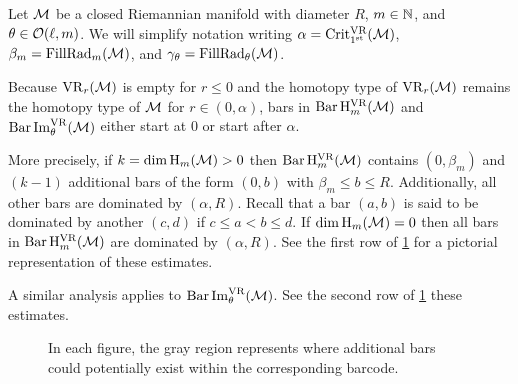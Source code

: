 Let \(\mathcal{M}\) be a closed Riemannian manifold with diameter \(R\), \(m \in \mathbb{N}\), and \(\theta \in \mathcal{O}(\ell,m)\).
We will simplify notation writing \(\alpha = \operatorname{Crit^{\mathrm{VR}}_{1^{\mathrm{st}}}}(\mathcal{M})\), \(\beta_m = \operatorname{FillRad}_{m}(\mathcal{M})\), and \(\gamma_\theta = \operatorname{FillRad}_{\theta}(\mathcal{M})\).

Because $\mathrm{VR}_r(\mathcal{M})$ is empty for \(r \leq 0\) and the homotopy type of $\mathrm{VR}_r(\mathcal{M})$ remains the homotopy type of $\mathcal{M}$ for $r \in (0, \alpha)$, bars in \(\operatorname{Bar} \mathrm{H}_m^{\mathrm{VR}}(\mathcal{M})\) and $\operatorname{Bar}\operatorname{Im}_\theta^{\mathrm{VR}}(\mathcal{M})$ either start at $0$ or start after $\alpha$.

More precisely,
if \(k = \dim \operatorname{H}_m(\mathcal{M}) > 0\) then $\operatorname{Bar}\mathrm{H}_m^{\mathrm{VR}}(\mathcal{M})$ contains $(0, \beta_m)$ and \((k - 1)\) additional bars of the form \((0, b)\) with \(\beta_m \leq b \leq R\).
Additionally, all other bars are dominated by \((\alpha, R)\).
Recall that a bar $(a, b)$ is said to be dominated by another $(c,d)$ if $c \leq a < b \leq d$.
If \(\dim \operatorname{H}_m(\mathcal{M}) = 0\) then all bars in \(\operatorname{Bar}\mathrm{H}_m^{\mathrm{VR}}(\mathcal{M})\) are dominated by \((\alpha, R)\).
See the first row of \cref{fig:barcodes_general} for a pictorial representation of these estimates.

A similar analysis applies to $\operatorname{Bar}\operatorname{Im}_\theta^{\mathrm{VR}}(\mathcal{M})$.
See the second row of \cref{fig:barcodes_general} these estimates.

\begin{figure}
	\centering
	
	\caption{In each figure, the gray region represents where additional bars could potentially exist within the corresponding barcode.}
	\label{fig:barcodes_general}
\end{figure}